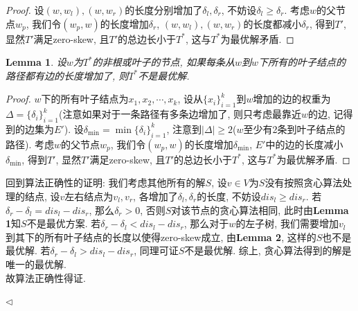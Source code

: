 \documentclass[11pt]{article}
\newtheorem{lemma}[theorem]{Lemma}
\newenvironment{answer}[1][Answer]{\begin{trivlist}
\item[\hskip \labelsep{\bfseries\itshape#1.}\hskip \labelsep]}{\hfill$\lhd$\end{trivlist}}
\begin{document}
\begin{answer}
\begin{itemize}
        \begin{proof}
            \kaishu
            设$(w, w_l), (w, w_r)$的长度分别增加了$\delta_l, \delta_r$, 不妨设$\delta_l \ge \delta_r$. 考虑$w$的父节点$w_p$, 我们令$(w_p, w)$的长度增加$\delta_r$, $(w, w_l), (w, w_r)$的长度都减小$\delta_r$, 得到$T'$, 显然$T'$满足zero-skew, 且$T'$的总边长小于$T^*$, 这与$T^*$为最优解矛盾.
        \end{proof}
        \begin{lemma}
            \songti
            设$w$为$T^*$的非根或叶子的节点, 如果每条从$w$到$w$下所有的叶子结点的路径都有边的长度增加了, 则$T^*$不是最优解.
        \end{lemma}
        \begin{proof}
            \kaishu
            $w$下的所有叶子结点为$x_1, x_2, \cdots, x_k$, 设从$\{x_i\}_{i=1}^{k}$到$w$增加的边的权重为$ \Delta = \{\delta_i\}_{i=1}^{k}$(注意如果对于一条路径有多条边增加了, 则只考虑最靠近$w$的边, 记得到的边集为$E'$). 设$\delta_{\min} = \min \{\delta_i\}_{i=1}^{k}$, 注意到$|\Delta| \ge 2$($w$至少有2条到叶子结点的路径). 考虑$w$的父节点$w_p$, 我们令$(w_p, w)$的长度增加$\delta_{\min}$, $E'$中的边的长度减小$\delta_{\min}$, 得到$T'$, 显然$T'$满足zero-skew, 且$T'$的总边长小于$T^*$, 这与$T^*$为最优解矛盾.
        \end{proof}
        回到算法正确性的证明: 我们考虑其他所有的解$S$, 设$v \in V$为$S$没有按照贪心算法处理的结点, 设$v$左右结点为$v_l, v_r$, 各增加了$\delta_l, \delta_r$的长度, 不妨设$dis_l \ge dis_r $. 若$\delta_r - \delta_l = dis_l - dis_r$, 那么$\delta_r > 0$, 否则$S$对该节点的贪心算法相同, 此时由\textbf{Lemma 1}知$S$不是最优方案. 若$\delta_r - \delta_l < dis_l - dis_r$, 那么对于$w$的左子树, 我们需要增加$v_l$到其下的所有叶子结点的长度以使得zero-skew成立, 由\textbf{Lemma 2}, 这样的$S$也不是最优解. 若$\delta_r - \delta_l > dis_l - dis_r$, 同理可证$S$不是最优解. 综上, 贪心算法得到的解是唯一的最优解.
        \\故算法正确性得证.
    \end{itemize}
\end{answer}
\end{document}
